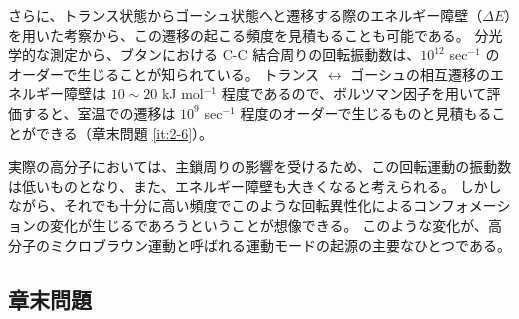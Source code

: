 \documentclass[uplatex,dvipdfmx,a4paper,11pt, titlepage]{jsarticle}
\begin{document}
さらに、トランス状態からゴーシュ状態へと遷移する際のエネルギー障壁（$\Delta E$）を用いた考察から、この遷移の起こる頻度を見積もることも可能である。
分光学的な測定から、ブタンにおける C-C 結合周りの回転振動数は、$10^{12}$ sec$^{-1}$ のオーダーで生じることが知られている。
トランス $\leftrightarrow$ ゴーシュの相互遷移のエネルギー障壁は $10 \sim 20$ kJ mol$^{-1}$ 程度であるので、ボルツマン因子を用いて評価すると、室温での遷移は $10^{9}$ sec$^{-1}$ 程度のオーダーで生じるものと見積もることができる（章末問題 \ref{it:2-6}）。

実際の高分子においては、主鎖周りの影響を受けるため、この回転運動の振動数は低いものとなり、また、エネルギー障壁も大きくなると考えられる。
しかしながら、それでも十分に高い頻度でこのような回転異性化によるコンフォメーションの変化が生じるであろうということが想像できる。
このような変化が、高分子のミクロブラウン運動と呼ばれる運動モードの起源の主要なひとつである。

\subsection{章末問題}
\end{document}

